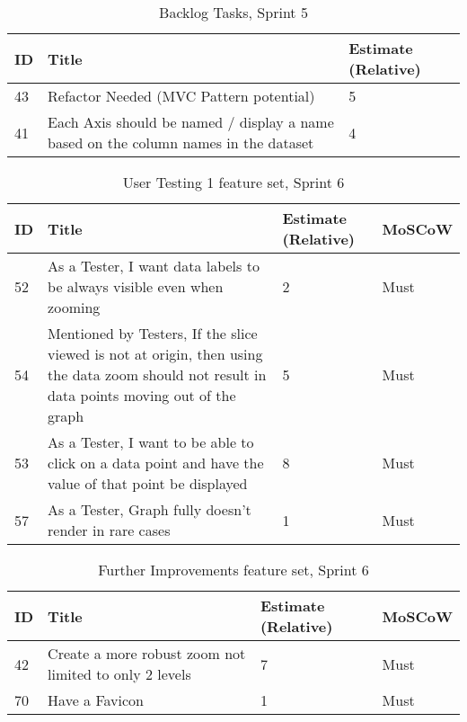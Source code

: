 \begin{table*}[hbt!]
    \begin{tabularx}{\textwidth}{ | X | X | X | }
        \hline
        ID & Title                                                                               & Estimate (Relative) \\
        \hline
        43 & Refactor Needed (MVC Pattern potential)                                             & 5                   \\
        \hline
        41 & Each Axis should be named / display a name based on the column names in the dataset & 4                   \\
        \hline
    \end{tabularx}
    \caption{Backlog Tasks, Sprint 5}
    \label{sprint5}
\end{table*}

\begin{table*}[hbt!]
    \begin{tabularx}{\textwidth}{ | X | X | X | X | }
        \hline
        ID & Title                                                                                                                                         & Estimate (Relative) & MoSCoW \\
        \hline
        52 & As a Tester, I want data labels to be always visible even when zooming                                                                        & 2                   & Must   \\
        \hline
        54 & Mentioned by Testers, If the slice viewed is not at origin, then using the data zoom should not result in data points moving out of the graph & 5                   & Must   \\
        \hline
        53 & As a Tester, I want to be able to click on a data point and have the value of that point be displayed                                         & 8                   & Must   \\
        \hline
        57 & As a Tester, Graph fully doesn't render in rare cases                                                                                         & 1                   & Must   \\
        \hline
    \end{tabularx}
    \caption{User Testing 1 feature set, Sprint 6}
    \label{sprint6}
\end{table*}

\begin{table*}[hbt!]
    \begin{tabularx}{\textwidth}{ | X | X | X | X | }
        \hline
        ID & Title                                                  & Estimate (Relative) & MoSCoW \\
        \hline
        42 & Create a more robust zoom not limited to only 2 levels & 7                   & Must   \\
        \hline
        70 & Have a Favicon                                         & 1                   & Must   \\
        \hline
    \end{tabularx}
    \caption{Further Improvements feature set, Sprint 6}
    \label{sprint6-2}
\end{table*}

